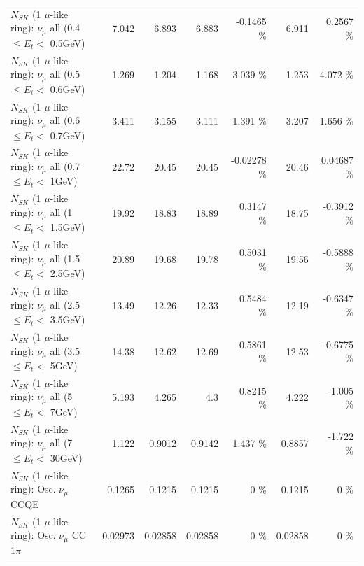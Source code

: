 \begin{table}
\begin{tabular}{| l | r | r | r  r | r  r |}
       $N_{SK}$ (1 $\mu$-like ring): $\nu_{\mu}$ all (0.4 $\leq E_{t} <$ 0.5GeV) &           7.042 &           6.893 &           6.883 &  -0.1465 \%  &           6.911 &   0.2567 \%  \\ 
       $N_{SK}$ (1 $\mu$-like ring): $\nu_{\mu}$ all (0.5 $\leq E_{t} <$ 0.6GeV) &           1.269 &           1.204 &           1.168 &   -3.039 \%  &           1.253 &    4.072 \%  \\ 
       $N_{SK}$ (1 $\mu$-like ring): $\nu_{\mu}$ all (0.6 $\leq E_{t} <$ 0.7GeV) &           3.411 &           3.155 &           3.111 &   -1.391 \%  &           3.207 &    1.656 \%  \\ 
         $N_{SK}$ (1 $\mu$-like ring): $\nu_{\mu}$ all (0.7 $\leq E_{t} <$ 1GeV) &           22.72 &           20.45 &           20.45 & -0.02278 \%  &           20.46 &  0.04687 \%  \\ 
         $N_{SK}$ (1 $\mu$-like ring): $\nu_{\mu}$ all (1 $\leq E_{t} <$ 1.5GeV) &           19.92 &           18.83 &           18.89 &   0.3147 \%  &           18.75 &  -0.3912 \%  \\ 
       $N_{SK}$ (1 $\mu$-like ring): $\nu_{\mu}$ all (1.5 $\leq E_{t} <$ 2.5GeV) &           20.89 &           19.68 &           19.78 &   0.5031 \%  &           19.56 &  -0.5888 \%  \\ 
       $N_{SK}$ (1 $\mu$-like ring): $\nu_{\mu}$ all (2.5 $\leq E_{t} <$ 3.5GeV) &           13.49 &           12.26 &           12.33 &   0.5484 \%  &           12.19 &  -0.6347 \%  \\ 
         $N_{SK}$ (1 $\mu$-like ring): $\nu_{\mu}$ all (3.5 $\leq E_{t} <$ 5GeV) &           14.38 &           12.62 &           12.69 &   0.5861 \%  &           12.53 &  -0.6775 \%  \\ 
           $N_{SK}$ (1 $\mu$-like ring): $\nu_{\mu}$ all (5 $\leq E_{t} <$ 7GeV) &           5.193 &           4.265 &             4.3 &   0.8215 \%  &           4.222 &   -1.005 \%  \\ 
          $N_{SK}$ (1 $\mu$-like ring): $\nu_{\mu}$ all (7 $\leq E_{t} <$ 30GeV) &           1.122 &          0.9012 &          0.9142 &    1.437 \%  &          0.8857 &   -1.722 \%  \\ 
\hline
\hline
                               $N_{SK}$ (1 $\mu$-like ring): Osc. $\nu_\mu$ CCQE &          0.1265 &          0.1215 &          0.1215 &        0 \%  &          0.1215 &        0 \%  \\ 
                          $N_{SK}$ (1 $\mu$-like ring): Osc. $\nu_\mu$ CC 1$\pi$ &         0.02973 &         0.02858 &         0.02858 &        0 \%  &         0.02858 &        0 \%  \\ 

\end{tabular}
\end{table}
